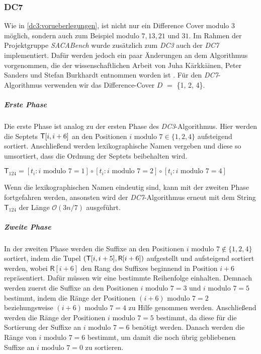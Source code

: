 \subsubsection{DC7}
\label{dc7}

Wie in \cref{dc3:vorueberlegungen}, ist nicht nur ein Difference Cover modulo $3$ möglich, sondern auch zum Beispiel modulo $7, 13, 21$ und $31$. Im Rahmen der Projektgruppe \emph{SACABench} wurde zusätzlich zum \emph{DC3} auch der \emph{DC7} implementiert. Dafür werden jedoch ein paar Änderungen an dem Algorithmus vorgenommen, die der wissenschaftlichen Arbeit von Juha Kärkkäinen, Peter Sanders und Stefan Burkhardt entnommen worden ist \cite{dc3:new}. Für den \emph{DC7}-Algorithmus verwenden wir das Difference-Cover \(D\) $=$ \{1, 2, 4\}.

\subparagraph*{Erste Phase}

Die erste Phase ist analog zu der ersten Phase des \emph{DC3}-Algorithmus. Hier werden die Septets $\inputtext[i,i+6]$ an den Positionen $i \text{ modulo } 7 \in \{1, 2, 4\}$ aufsteigend sortiert. Anschließend werden lexikographische Namen vergeben und diese so umsortiert, dass die Ordnung der Septets beibehalten wird.
\begin{center}
	$\mathsf{T}_{124} = [t_i : i \text{ modulo } 7 = 1] \circ [t_i : i \text{ modulo } 7 = 2] \circ [t_i : i \text{ modulo } 7 = 4]$ 
\end{center}
Wenn die lexikographischen Namen eindeutig sind, kann mit der zweiten Phase fortgefahren werden, ansonsten wird der \emph{DC7}-Algorithmus erneut mit dem String $\mathsf{T}_{124}$ der Länge $\mathcal{O}(3n/7)$ ausgeführt.

\subparagraph*{Zweite Phase}

In der zweiten Phase werden die Suffixe an den Positionen $i \text{ modulo } 7 \notin \{1, 2, 4\}$ sortiert, indem die Tupel $(\inputtext[i, i+5], \mathsf{R}[i+6])$ aufgestellt und aufsteigend sortiert werden, wobei $\mathsf{R}[i+6]$ den Rang des Suffixes beginnend in Position $i + 6$ repräsentiert. Dafür müssen wir eine bestimmte Reihenfolge einhalten. Demnach werden zuerst die Suffixe an den Positionen $i \text{ modulo } 7 = 3$ und $i \text{ modulo } 7 = 5$ bestimmt, indem die Ränge der Positionen $(i+6) \text{ modulo } 7 = 2$ beziehungsweise $(i+6) \text{ modulo } 7 = 4$ zu Hilfe genommen werden. Anschließend werden die Ränge der Positionen $i \text{ modulo } 7 = 5$ bestimmt, da diese für die Sortierung der Suffixe an $i \text{ modulo } 7 = 6$ benötigt werden. Danach werden die Ränge von $i \text{ modulo } 7 = 6$ bestimmt, um damit die noch übrig gebliebenen Suffixe an $i \text{ modulo } 7 = 0$ zu sortieren.


